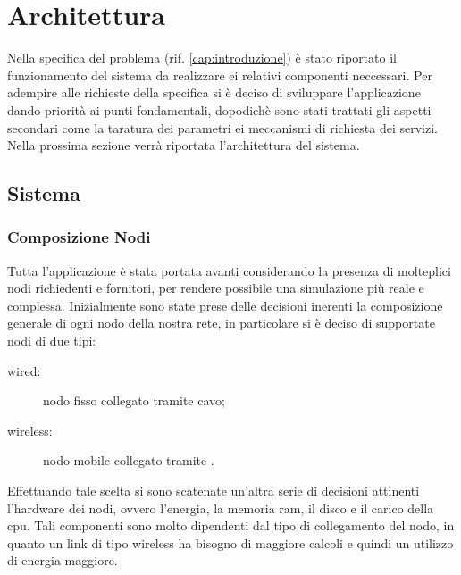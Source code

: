 \chapter{Architettura}\label{cap:architettura}
Nella specifica del problema (rif. \ref{cap:introduzione}) è stato riportato il funzionamento del sistema da realizzare ei relativi componenti neccessari. Per adempire alle richieste della specifica si è deciso di sviluppare l'applicazione dando priorità ai punti fondamentali, dopodichè sono stati trattati gli aspetti secondari come la taratura dei parametri ei meccanismi di richiesta dei servizi. Nella prossima sezione verrà riportata l'architettura del sistema.
\section{Sistema}
\subsection{Composizione Nodi}
Tutta l'applicazione è stata portata avanti considerando la presenza di molteplici nodi richiedenti e fornitori, per rendere possibile una simulazione più reale e complessa. Inizialmente sono state prese delle decisioni inerenti la composizione generale di ogni nodo della nostra rete, in particolare si è deciso di supportate nodi di due tipi:
\begin{description}
\item[wired:] nodo fisso collegato tramite cavo;
\item[wireless:] nodo mobile collegato tramite .
\end{description}
Effettuando tale scelta si sono scatenate un'altra serie di decisioni attinenti l'hardware dei nodi, ovvero l'energia, la memoria ram, il disco e il carico della cpu. Tali componenti sono molto dipendenti dal tipo di collegamento del nodo, in quanto un link di tipo wireless ha bisogno di maggiore calcoli e quindi un utilizzo di energia maggiore.
